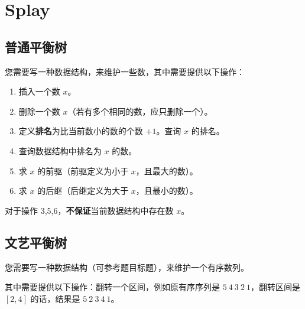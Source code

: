 \section{Splay}

\subsection{普通平衡树}

您需要写一种数据结构，来维护一些数，其中需要提供以下操作：
\begin{enumerate}
    \item 插入一个数 $x$。
    \item 删除一个数 $x$（若有多个相同的数，应只删除一个）。
    \item 定义\textbf{排名}为比当前数小的数的个数 $+1$。查询 $x$ 的排名。
    \item 查询数据结构中排名为 $x$ 的数。
    \item 求 $x$ 的前驱（前驱定义为小于 $x$，且最大的数）。
    \item 求 $x$ 的后继（后继定义为大于 $x$，且最小的数）。
\end{enumerate}
对于操作 3,5,6，\textbf{不保证}当前数据结构中存在数 $x$。



\subsection{文艺平衡树}
您需要写一种数据结构（可参考题目标题），来维护一个有序数列。

其中需要提供以下操作：翻转一个区间，例如原有序序列是 $5\ 4\ 3\ 2\ 1$，翻转区间是 $[2,4]$ 的话，结果是 $5\ 2\ 3\ 4\ 1$。

